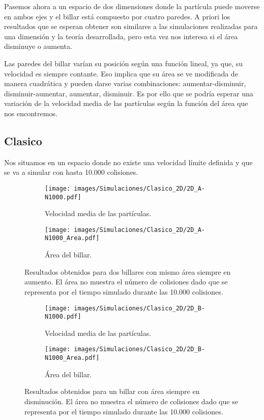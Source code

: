 Pasemos ahora a un espacio de dos dimensiones donde la partícula puede moverse en ambos ejes y el billar está compuesto por cuatro paredes. A priori los resultados que se esperan obtener son similares a las simulaciones realizadas para una dimensión y la teoría desarrollada, pero esta vez nos interesa si el área disminuye o aumenta.

\vspace{3mm}

Las paredes del billar varían su posición según una función lineal, ya que, su velocidad es siempre contante. Eso implica que su área se ve modificada de manera cuadrática y pueden darse varias combinaciones: aumentar-disminuir, disminuir-aumentar, aumentar, disminuir. Es por ello que se podría esperar una variación de la velocidad media de las partículas según la función del área que nos encontremos. 

\subsection{Clasico}

Nos situamos en un espacio donde no existe una velocidad límite definida y que se va a simular con hasta 10.000 colisiones.

\begin{figure}[h]
    \begin{subfigure}[b]{0.5\textwidth}
        \centering
        \texttt{[image: images/Simulaciones/Clasico\_2D/2D\_A-N1000.pdf]}
        \caption{Velocidad media de las partículas.}
    \end{subfigure}
    \hfill
    \begin{subfigure}[b]{0.5\textwidth}
        \centering
        \texttt{[image: images/Simulaciones/Clasico\_2D/2D\_A-N1000\_Area.pdf]}
        \caption{Área del billar.}
    \end{subfigure}
    \caption{Resultados obtenidos para dos billares con mismo área siempre en aumento. El área no muestra el número de colisiones dado que se representa por el tiempo simulado durante las 10.000 colisiones.}
    \label{fig:2D_A-N1000_con_Area}
\end{figure}

\begin{figure}[h]
    \begin{subfigure}[b]{0.5\textwidth}
        \centering
        \texttt{[image: images/Simulaciones/Clasico\_2D/2D\_B-N1000.pdf]}
        \caption{Velocidad media de las partículas.}
    \end{subfigure}
    \hfill
    \begin{subfigure}[b]{0.5\textwidth}
        \centering
        \texttt{[image: images/Simulaciones/Clasico\_2D/2D\_B-N1000\_Area.pdf]}
        \caption{Área del billar.}
    \end{subfigure}
    \caption{Resultados obtenidos para un billar con área siempre en disminución. El área no muestra el número de colisiones dado que se representa por el tiempo simulado durante las 10.000 colisiones.}
    \label{fig:2D_B-N1000_con_Area}
\end{figure}

